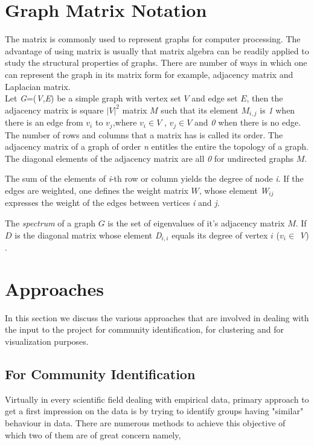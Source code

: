 \section{Graph Matrix Notation}
The matrix is commonly used to represent graphs for computer processing. The advantage of using matrix is usually that matrix algebra can be readily applied to study the structural properties of graphs. There are number of ways in which one can represent the graph in its matrix form for example, adjacency matrix and Laplacian matrix. 
\\
Let \textit{G}=(\textit{V},\textit{E}) be a simple graph with vertex set $V$ and edge set $E$, then the adjacency matrix is square $|V|^2$ matrix $M$ such that its element $M_{i,j}$ is \textit{1} when there is an edge from $v_i$ to $v_j$,where $v_i \in V$ , $ v_j \in V $ and \textit{0} when there is no edge. The number of rows and columns that a matrix has is called its order.
The adjacency matrix of a graph of order \textit{n} entitles the entire the topology of a graph.  The diagonal elements of the adjacency matrix are all \textit{0} for undirected graphs $M$.

\par The sum of the elements of \textit{i}-th row or column yields the degree of node \textit{i}. If the edges are weighted, one defines the weight matrix $W$, whose element \textit{W}$_{ij}$ expresses the weight of the edges between vertices \textit{i} and \textit{j}.

\par The \textit{spectrum} of a graph $G$ is the set of eigenvalues of it's adjacency matrix $M$. If $D$  is the diagonal matrix whose element \textit{D}$_{i,i}$ equals its degree of vertex $i$ ($v_i \in$ \textit{V}) \cite{matrep}.

\section{Approaches}
In this section we discuss the various approaches that are involved in dealing with the input to the project for community identification, for clustering and for visualization purposes. 
\subsection{For Community Identification}
Virtually in every scientific field dealing with empirical data, primary approach to get a first impression on the data is by trying to identify groups having "similar" behaviour in data. There are numerous methods to achieve this objective of which two of them are of great concern namely,

